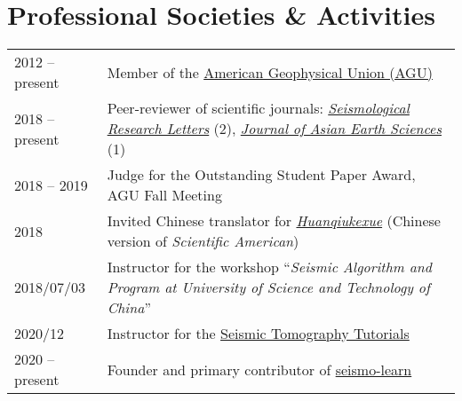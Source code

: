 \section*{Professional Societies \& Activities}

\newcommand{\tabitem}{~~\llap{\textbullet}~~}

\begin{tabular}{p{} p{}}
2012 -- present & Member of the \href{https://sites.agu.org/}{American Geophysical Union (AGU)} \\
2018 -- present & Peer-reviewer of scientific journals:
                  \textit{\href{https://pubs.geoscienceworld.org/srl/}{Seismological Research Letters}} (2),
                  \textit{\href{https://www.journals.elsevier.com/journal-of-asian-earth-sciences/}{Journal of Asian Earth Sciences}} (1) \\
2018 -- 2019 & Judge for the Outstanding Student Paper Award, AGU Fall Meeting \\
2018         & Invited Chinese translator for \href{https://huanqiukexue.com/}{\textit{Huanqiukexue}} (Chinese version of \textit{Scientific American}) \\
2018/07/03   & Instructor for the workshop “\textit{Seismic Algorithm and Program at University of Science and Technology of China}” \\
2020/12 & Instructor for the \href{https://migg-ntu.github.io/SeisTomo_Tutorials/}{Seismic Tomography Tutorials} \\
2020 -- present & Founder and primary contributor of \href{https://seismo-learn.org/}{seismo-learn} \\
\end{tabular}
